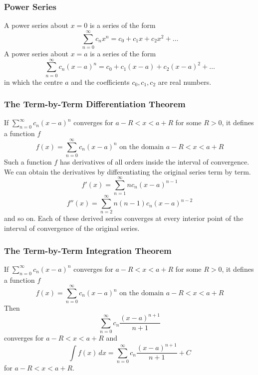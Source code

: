 \documentclass[xcolor=dvipsnames]{beamer}
\begin{document}
\begin{frame}
  \frametitle{Power Series}
  A \alert{power series about $x=0$} is a series of the form
  \begin{equation}
    \label{eq:eecizaja}
    \sum_{n=0}^{\infty}c_{n}x^{n}=c_{0}+c_{1}x+c_{2}x^{2}+{\ldots}
  \end{equation}
  A \alert{power series about $x=a$} is a series of the form
  \begin{equation}
    \label{eq:coojudie}
    \sum_{n=0}^{\infty}c_{n}(x-a)^{n}=c_{0}+c_{1}(x-a)+c_{2}(x-a)^{2}+{\ldots}
  \end{equation}
in which the centre $a$ and the coefficients $c_{0},c_{1},c_{2}$ are real numbers.
\end{frame}

\begin{frame}
  \frametitle{The Term-by-Term Differentiation Theorem}
  If $\sum_{n=0}^{\infty}c_{n}(x-a)^{n}$ converges for $a-R<x<a+R$ for some $R>0$, it defines a function $f$
  \begin{equation}
    \label{eq:aengooph}
    f(x)=\sum_{n=0}^{\infty}c_{n}(x-a)^{n}\mbox{ on the domain }a-R<x<a+R
  \end{equation}
  Such a function $f$ has derivatives of all orders inside the interval of convergence. We can obtain the derivatives by differentiating the original series term by term.
  \begin{equation}
    \label{eq:eghoocah}
    f'(x)=\sum_{n=1}^{\infty}nc_{n}(x-a)^{n-1}
  \end{equation}
  \begin{equation}
    \label{eq:xalaixii}
    f''(x)=\sum_{n=2}^{\infty}n(n-1)c_{n}(x-a)^{n-2}
  \end{equation}
and so on. Each of these derived series converges at every interior point of the interval of convergence of the original series.
\end{frame}

\begin{frame}
  \frametitle{The Term-by-Term Integration Theorem}
  If $\sum_{n=0}^{\infty}c_{n}(x-a)^{n}$ converges for $a-R<x<a+R$ for some $R>0$, it defines a function $f$
  \begin{equation}
    \label{eq:ohmaekel}
    f(x)=\sum_{n=0}^{\infty}c_{n}(x-a)^{n}\mbox{ on the domain }a-R<x<a+R
  \end{equation}
  Then
  \begin{equation}
    \label{eq:iechaefi}
    \sum_{n=0}^{\infty}c_{n}\frac{(x-a)^{n+1}}{n+1}
  \end{equation}
converges for $a-R<x<a+R$ and
  \begin{equation}
    \label{eq:aibooqui}
    \int{}f(x)\,dx=\sum_{n=0}^{\infty}c_{n}\frac{(x-a)^{n+1}}{n+1}+C
  \end{equation}
for $a-R<x<a+R$.
\end{frame}
\end{document}
